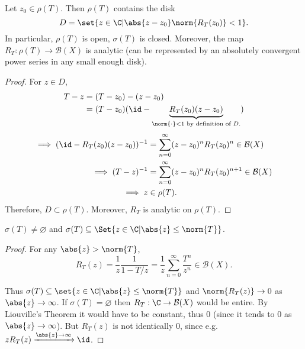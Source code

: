 \documentclass{article}
\renewcommand{\emptyset}{\varnothing}
\begin{document}

\begin{prop}
    Let $z_0 \in \rho(T)$. Then $\rho(T)$ contains the disk
    \begin{equation*}
        D = \set{z \in \C | \abs{z - z_0} \norm{R_T(z_0)} < 1}.
    \end{equation*}
    In particular, $\rho(T)$ is open, $\sigma(T)$ is closed.
    Moreover, the map $R_T : \rho(T) \to \mathcal{B}(X)$ is analytic (can be represented by an absolutely convergent power series in any small enough disk).
\end{prop}

\begin{proof}
    For $z \in D$,
    \begin{align*}
        T - z &= (T-z_0) - (z - z_0) \\
              &= (T - z_0)(\id - \underbrace{R_T(z_0)(z - z_0)}_{\norm{\cdot} < 1 \text{ by definition of $D$.}})
    \end{align*}
    \begin{align*}
        \implies (\id - R_T(z_0)(z-z_0))^{-1} &= \sum_{n=0}^\infty (z-z_0)^n R_T(z_0)^n \in \mathcal{B}(X) \\
        \implies (T-z)^{-1} &= \sum_{n=0}^\infty (z-z_0)^n R_T(z_0)^{n+1} \in \mathcal{B}(X) \\
        \implies z &\in \rho(T). \\
    \end{align*}
    Therefore, $D \subset \rho(T)$. Moreover, $R_T$ is analytic on $\rho(T)$.
\end{proof}

\begin{cor}
    $\sigma(T) \neq \emptyset$ and $\sigma(T) \subseteq \Set{z \in \C | \abs{z} \leq \norm{T}}$.
\end{cor}

\begin{proof}
    For any $\abs{z} > \norm{T}$,
    \begin{equation*}
        R_T(z) = \frac{1}{z} \frac{1}{1 - T/z} = \frac{1}{z} \sum_{n=0}^\infty \frac{T^n}{z^n} \in \mathcal{B}(X).
    \end{equation*}

    Thus $\sigma(T) \subseteq \set{z \in \C | \abs{z} \leq \norm{T}}$ and $\norm{R_T(z)} \to 0$ as $\abs{z} \to \infty$.
    If $\sigma(T) = \emptyset$ then $R_T: \C \to \mathcal{B}(X)$ would be entire.
    By Liouville's Theorem it would have to be constant, thus $0$ (since it tends to $0$ as $\abs{z} \to \infty$).
    But $R_T(z)$ is not identically $0$, since e.g. $z R_T(z) \xrightarrow{\abs{z} \to \infty} \id$.
\end{proof}
\end{document}
